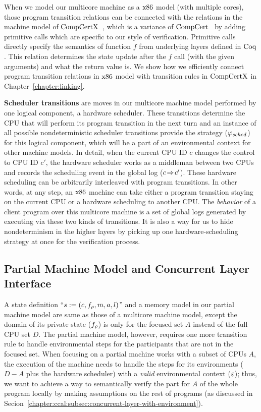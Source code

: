 When we model our multicore machine as a $\mathrm{x86}$ model (with multiple cores),
those program transition relations can be connected with the relations 
in the machine model of $\mathrm{CompCertX}$~\cite{deepspec},
which is a variance of $\mathrm{CompCert}$~\cite{leroy09}
by adding primitive calls which are specific to our style of verification.
Primitive calls directly specify the semantics of function $f$ from underlying layers defined in $\mathrm{Coq}$. 
This relation determines the state update after the $f$ call (with the given arguments) and what the return value is.
We show how we efficiently connect program transition relations in 
$\mathrm{x86}$ model with transition rules in $\mathrm{CompCertX}$ in Chapter~\ref{chapter:linking}.

\textbf{Scheduler transitions} are moves in our multicore machine model performed by one logical component, a hardware scheduler.
 These transitions determine  the CPU that will perform its program transition 
in the next turn and 
an instance of all possible nondeterministic scheduler transitions provide 
the strategy   ($\varphi_{sched}$) for this logical component, 
which will be a part of an environmental context for other machine models. 
In detail, when the current CPU ID $c$ changes
the control to CPU ID $c'$,
the hardware scheduler works as a
middleman between 
two CPUs and records the scheduling event 
in the global log ($c \!\Rightarrow\! c'$).
These hardware scheduling
can be arbitrarily interleaved with
program transitions.
In other words, at any step,
an $\mathrm{x86}$ machine can take either a program transition staying
on the current CPU
or a hardware scheduling to another CPU.
The \emph{behavior} of a client program  over this multicore machine is a set of global logs generated by executing  via these two kinds of transitions.
It is also a way for us to hide nondeterminism in the higher layers
by picking up 
one hardware-scheduling strategy at once for the verification process.

\subsection{Partial  Machine Model and Concurrent Layer Interface}
\label{chapter:ccal:subsec:concurrent-layer-interface}


A state definition ``$s := (c, f_{\rho}, m, a, l)$'' and a memory model in our partial machine model are
same as those of a multicore machine model, 
except the domain of its private state ($f_{\rho}$) is only for the focused set $A$ instead of the full CPU set $D$.
The partial machine model, however, requires one more transition rule to handle environmental steps for the participants that are not in the focused set.
When focusing on a partial machine works with a subset of CPUs $A$,
the execution of the machine needs to handle 
the steps for its environments ($D - A$ plus the hardware scheduler) with a \textit{valid} environmental context (${\varepsilon}$);
thus, we want to  achieve a way to semantically verify the part for $A$ of the whole program locally
by making  assumptions on the rest of programs (as discussed in Secion~\ref{chapter:ccal:subsec:concurrent-layer-with-environment}).

